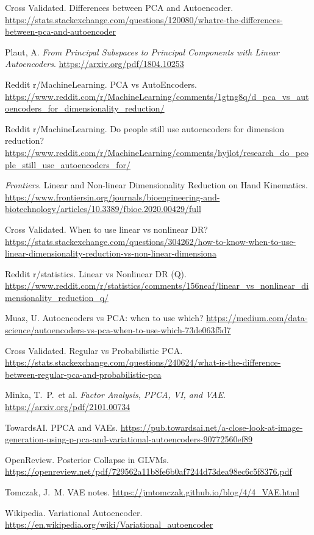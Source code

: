 \documentclass[11pt]{article}
\begin{document}
\begin{enumerate}[leftmargin=1.2em,label={[\arabic*]}]
\item Cross Validated. Differences between PCA and Autoencoder. \url{https://stats.stackexchange.com/questions/120080/whatre-the-differences-between-pca-and-autoencoder}
\item Plaut, A. \emph{From Principal Subspaces to Principal Components with Linear Autoencoders}. \url{https://arxiv.org/pdf/1804.10253}
\item Reddit r/MachineLearning. PCA vs AutoEncoders. \url{https://www.reddit.com/r/MachineLearning/comments/1gtng8q/d_pca_vs_autoencoders_for_dimensionality_reduction/}
\item Reddit r/MachineLearning. Do people still use autoencoders for dimension reduction? \url{https://www.reddit.com/r/MachineLearning/comments/hyjlot/research_do_people_still_use_autoencoders_for/}
\item \emph{Frontiers}. Linear and Non-linear Dimensionality Reduction on Hand Kinematics. \url{https://www.frontiersin.org/journals/bioengineering-and-biotechnology/articles/10.3389/fbioe.2020.00429/full}
\item Cross Validated. When to use linear vs nonlinear DR? \url{https://stats.stackexchange.com/questions/304262/how-to-know-when-to-use-linear-dimensionality-reduction-vs-non-linear-dimensiona}
\item Reddit r/statistics. Linear vs Nonlinear DR (Q). \url{https://www.reddit.com/r/statistics/comments/156neaf/linear_vs_nonlinear_dimensionality_reduction_q/}
\item Muaz, U. Autoencoders vs PCA: when to use which? \url{https://medium.com/data-science/autoencoders-vs-pca-when-to-use-which-73de063f5d7}
\item Cross Validated. Regular vs Probabilistic PCA. \url{https://stats.stackexchange.com/questions/240624/what-is-the-difference-between-regular-pca-and-probabilistic-pca}
\item Minka, T.\ P.\ et al. \emph{Factor Analysis, PPCA, VI, and VAE}. \url{https://arxiv.org/pdf/2101.00734}
\item TowardsAI. PPCA and VAEs. \url{https://pub.towardsai.net/a-close-look-at-image-generation-using-p-pca-and-variational-autoencoders-90772560ef89}
\item OpenReview. Posterior Collapse in GLVMs. \url{https://openreview.net/pdf/729562a11b8fe6b0af7244d73dea98ec6c5f8376.pdf}
\item Tomczak, J.\ M. VAE notes. \url{https://jmtomczak.github.io/blog/4/4_VAE.html}
\item Wikipedia. Variational Autoencoder. \url{https://en.wikipedia.org/wiki/Variational_autoencoder}

\end{enumerate}
\end{document}
